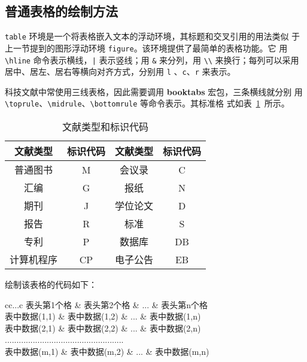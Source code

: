 \subsection{普通表格的绘制方法}

\texttt{table} 环境是一个将表格嵌入文本的浮动环境，其标题和交叉引用的用法类似
于上一节提到的图形浮动环境 \texttt{figure}。该环境提供了最简单的表格功能。它
用 \verb|\hline| 命令表示横线，\verb&|& 表示竖线；用 \verb|&| 来分列，用
\verb|\\| 来换行；每列可以采用居中、居左、居右等横向对齐方式，分别用 \verb|l|
、\verb|c|、\verb|r| 来表示。

科技文献中常使用三线表格，因此需要调用 \textbf{booktabs} 宏包，三条横线就分别
用 \verb|\toprule|、\verb|\midrule|、\verb|\bottomrule| 等命令表示。其标准格
式如表~\ref{table1}~所示。

\begin{table}[htbp]
\caption{文献类型和标识代码}
\label{table1}
\centering
\begin{tabular}{cccc}
\toprule
文献类型 & 标识代码 & 文献类型 & 标识代码\\
\midrule
普通图书 & M &  会议录 & C\\
汇编 & G & 报纸 & N\\
期刊 & J & 学位论文 & D\\
报告 & R & 标准 & S\\
专利 & P & 数据库 & DB\\
计算机程序 & CP & 电子公告 & EB\\
\bottomrule
\end{tabular}
\end{table}

绘制该表格的代码如下：
\begin{code}
\begin{table}[htbp]
\caption{表格标题}
\label{标签名}
\centering
\begin{tabular}{cc...c}
\toprule
表头第1个格   & 表头第2个格   & ... & 表头第n个格  \\
\midrule
表中数据(1,1) & 表中数据(1,2) & ... & 表中数据(1,n)\\
表中数据(2,1) & 表中数据(2,2) & ... & 表中数据(2,n)\\
...................................................\\
表中数据(m,1) & 表中数据(m,2) & ... & 表中数据(m,n)\\
\bottomrule
\end{tabular}
\end{table}
\end{code}

